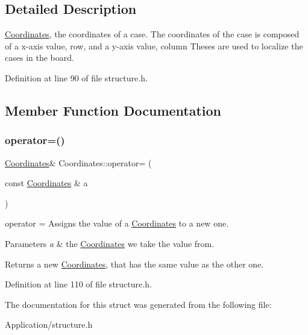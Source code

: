 \subsection{Detailed Description}
\hyperlink{struct_coordinates}{Coordinates}, the coordinates of a case. The coordinates of the case is composed of a x-\/axis value, row, and a y-\/axis value, column Theses are used to localize the cases in the board. 

Definition at line 90 of file structure.\+h.



\subsection{Member Function Documentation}
\mbox{\label{struct_coordinates_a150b9f9ce9574f29bec14407021e7292}} 
\subsubsection{\texorpdfstring{operator=()}{operator=()}}
{\footnotesize\ttfamily \hyperlink{struct_coordinates}{Coordinates}\& Coordinates\+::operator= (\begin{DoxyParamCaption}\item[{const \hyperlink{struct_coordinates}{Coordinates} \&}]{a }\end{DoxyParamCaption})\hspace{0.3cm}{\ttfamily [inline]}}



operator = Assigns the value of a \hyperlink{struct_coordinates}{Coordinates} to a new one. 


\begin{DoxyParams}{Parameters}
{\em a} & the \hyperlink{struct_coordinates}{Coordinates} we take the value from. \\
\hline
\end{DoxyParams}
\begin{DoxyReturn}{Returns}
a new \hyperlink{struct_coordinates}{Coordinates}, that has the same value as the other one. 
\end{DoxyReturn}


Definition at line 110 of file structure.\+h.



The documentation for this struct was generated from the following file\+:\begin{DoxyCompactItemize}
\item 
Application/structure.\+h\end{DoxyCompactItemize}
